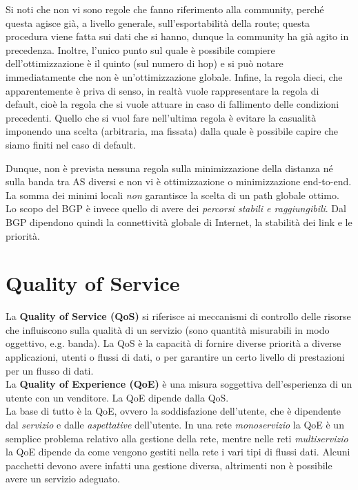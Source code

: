 Si noti che non vi sono regole che fanno riferimento alla community, perché questa agisce già, a livello generale, sull'esportabilità della route; questa procedura viene fatta sui dati che si hanno, dunque la community ha già agito in precedenza. Inoltre, l'unico punto sul quale è possibile compiere dell'ottimizzazione è il quinto (sul numero di hop) e si può notare immediatamente che non è un'ottimizzazione globale. Infine, la regola dieci, che apparentemente è priva di senso, in realtà vuole rappresentare la regola di default, cioè la regola che si vuole attuare in caso di fallimento delle condizioni precedenti. Quello che si vuol fare nell'ultima regola è evitare la casualità imponendo una scelta (arbitraria, ma fissata) dalla quale è possibile capire che siamo finiti nel caso di default.

Dunque, non è prevista nessuna regola sulla minimizzazione della distanza né sulla banda tra AS diversi e non vi è ottimizzazione o minimizzazione end-to-end. La somma dei minimi locali \textit{non} garantisce la scelta di un path globale ottimo. Lo scopo del BGP è invece quello di avere dei \textit{percorsi stabili e raggiungibili}. Dal BGP dipendono quindi la connettività globale di Internet, la stabilità dei link e le priorità.

\section{Quality of Service}
La \textbf{Quality of Service (QoS)} si riferisce ai meccanismi di controllo delle risorse che influiscono sulla qualità di un servizio (sono quantità misurabili in modo oggettivo, e.g. banda). La QoS è la capacità di fornire diverse priorità a diverse applicazioni, utenti o flussi di dati, o per garantire un certo livello di prestazioni per un flusso di dati.\\
La \textbf{Quality of Experience (QoE)} è una misura soggettiva dell'esperienza di un utente con un venditore. La QoE dipende dalla QoS.\\
La base di tutto è la QoE, ovvero la soddisfazione dell'utente, che è dipendente dal \textit{servizio} e dalle \textit{aspettative} dell'utente. In una rete \textit{monoservizio} la QoE è un semplice problema relativo alla gestione della rete, mentre nelle reti \textit{multiservizio} la QoE dipende da come vengono gestiti nella rete i vari tipi di flussi dati. Alcuni pacchetti devono avere infatti una gestione diversa, altrimenti non è possibile avere un servizio adeguato.

